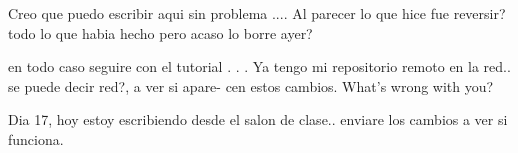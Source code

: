 Creo que puedo escribir aqui sin problema
....
Al parecer lo que hice fue reversir? todo lo que habia hecho
pero acaso lo borre ayer?

en todo caso seguire con el tutorial
.
.
.
Ya tengo mi repositorio remoto en la red.. se puede decir red?, a ver si apare-
cen estos cambios.
What's wrong with you?

Dia 17, hoy estoy escribiendo desde el salon de clase.. enviare los cambios a 
ver si funciona.
